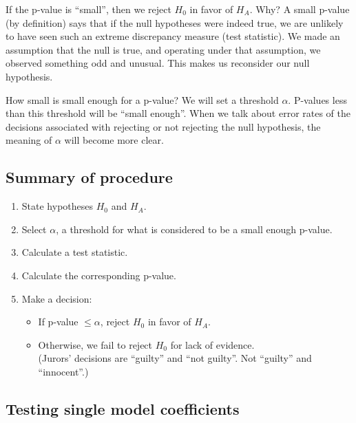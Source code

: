 \documentclass[
]{book}
\providecommand{\tightlist}{%
  \setlength{\itemsep}{0pt}\setlength{\parskip}{0pt}}
\begin{document}
If the p-value is ``small'', then we reject \(H_0\) in favor of \(H_A\). Why? A small p-value (by definition) says that if the null hypotheses were indeed true, we are unlikely to have seen such an extreme discrepancy measure (test statistic). We made an assumption that the null is true, and operating under that assumption, we observed something odd and unusual. This makes us reconsider our null hypothesis.

How small is small enough for a p-value? We will set a threshold \(\alpha\). P-values less than this threshold will be ``small enough''. When we talk about error rates of the decisions associated with rejecting or not rejecting the null hypothesis, the meaning of \(\alpha\) will become more clear.

\hypertarget{summary-of-procedure}{%
\subsection{Summary of procedure}\label{summary-of-procedure}}

\begin{enumerate}
\def\labelenumi{\arabic{enumi}.}
\tightlist
\item
  State hypotheses \(H_0\) and \(H_A\).
\item
  Select \(\alpha\), a threshold for what is considered to be a small enough p-value.
\item
  Calculate a test statistic.
\item
  Calculate the corresponding p-value.
\item
  Make a decision:

  \begin{itemize}
  \tightlist
  \item
    If p-value \(\leq\alpha\), reject \(H_0\) in favor of \(H_A\).
  \item
    Otherwise, we fail to reject \(H_0\) for lack of evidence.\\
    (Jurors' decisions are ``guilty'' and ``not guilty''. Not ``guilty'' and ``innocent''.)
  \end{itemize}
\end{enumerate}

\hypertarget{testing-single-model-coefficients}{%
\subsection{Testing single model coefficients}\label{testing-single-model-coefficients}}
\end{document}
